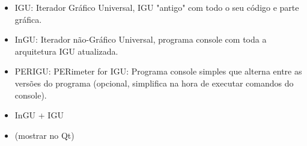 \documentclass[10pt]{beamer}
\theoremstyle{remark}
\theoremstyle{definition}
\begin{document}
\begin{frame}[allowframebreaks]
\begin{itemize}
		\item IGU: Iterador Gráfico Universal, IGU "antigo" com todo o seu código e parte gráfica.
		
		\item InGU: Iterador não-Gráfico Universal, programa console com toda a arquitetura IGU atualizada.
		
		\item PERIGU: PERimeter for IGU: Programa console simples que alterna entre as versões do programa (opcional, simplifica na hora de executar comandos do console).
		
	\end{itemize}
	
	
	\framebreak
	
	\begin{itemize}
		\item InGU + IGU
		
		\item (mostrar no Qt)
	\end{itemize}
	
\end{frame}
\end{document}
